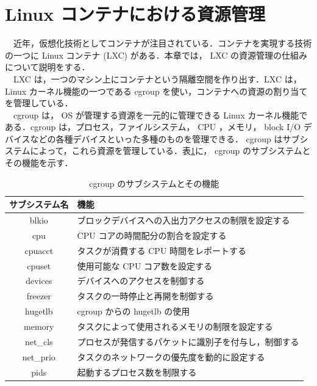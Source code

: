 \documentclass[graduation-thesis]{jsarticle}
\begin{document}
\section{Linux コンテナにおける資源管理}
\label{sec:LXC}
　近年，仮想化技術としてコンテナが注目されている．コンテナを実現する技術の一つに Linux コンテナ (LXC) がある．本章では， LXC の資源管理の仕組みについて説明をする．\\
　LXC は，一つのマシン上にコンテナという隔離空間を作り出す．LXC は， Linux カーネル機能の一つである cgroup を使い，コンテナへの資源の割り当てを管理している．\\
　cgroup は， OS が管理する資源を一元的に管理できる Linux カーネル機能である．cgroup は，プロセス，ファイルシステム， CPU ，メモリ， block I/O デバイスなどの各種デバイスといった多種のものを管理できる． cgroup はサブシステムによって，これら資源を管理している．表\ref{tb:subsystem}に， cgroup のサブシステムとその機能を示す．\\
\begin{table}[htb]
	\begin{center}
		\caption{cgroup のサブシステムとその機能}
		\begin{tabular}{|c||l|} \hline
			サブシステム名 & 機能\\
			\hline \hline
			blkio & ブロックデバイスへの入出力アクセスの制限を設定する\\
			\hline
			cpu & CPU コアの時間配分の割合を設定する\\
			\hline
			cpuacct & タスクが消費する CPU 時間をレポートする\\
			\hline
			cpuset & 使用可能な CPU コア数を設定する\\
			\hline
			devices & デバイスへのアクセスを制御する\\
			\hline
			freezer & タスクの一時停止と再開を制御する\\
			\hline
			hugetlb & cgroup からの hugetlb の使用\\
			\hline
			memory & タスクによって使用されるメモリの制限を設定する\\
			\hline
			net\_cls & プロセスが発信するパケットに識別子を付与し，制御する\\
			\hline
			net\_prio & タスクのネットワークの優先度を動的に設定する\\
			\hline
			pids & 起動するプロセス数を制限する\\
			\hline
		\end{tabular}
		\label{tb:subsystem}
	\end{center}
\end{table}
\end{document}
